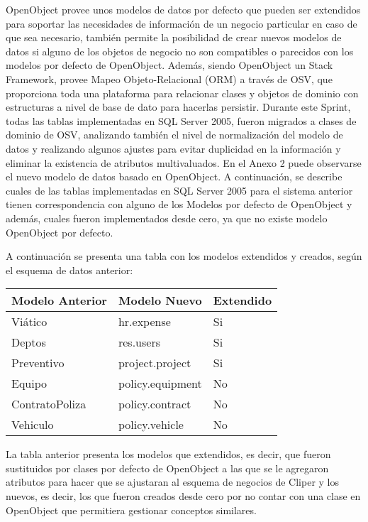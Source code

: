 \documentclass[a4paper, 12pt]{article}
\begin{document}
OpenObject provee unos modelos de datos por defecto que pueden ser extendidos para soportar las necesidades de información de un negocio particular en caso de que sea necesario, también permite la posibilidad de crear nuevos modelos de datos si alguno de los objetos de negocio no son compatibles o parecidos con los modelos por defecto de OpenObject. Además, siendo OpenObject un Stack Framework, provee Mapeo Objeto-Relacional (ORM) a través de OSV, que proporciona toda una plataforma para relacionar clases y objetos de dominio con estructuras a nivel de base de dato para hacerlas persistir. Durante este Sprint, todas las tablas implementadas en SQL Server 2005, fueron migrados a clases de dominio de OSV, analizando también el nivel de normalización del modelo de datos y realizando algunos ajustes para evitar duplicidad en la información y eliminar la existencia de atributos multivaluados. En el Anexo 2 puede observarse el nuevo modelo de datos basado en OpenObject. A continuación, se describe cuales de las tablas implementadas en SQL Server 2005 para el sistema anterior tienen correspondencia con alguno de los Modelos por defecto de OpenObject y además, cuales fueron implementados desde cero, ya que no existe modelo OpenObject por defecto.

A continuación se presenta una tabla con los modelos extendidos y creados, según el esquema de datos anterior:
\begin{center}
    \begin{tabular}{ | p{5cm} | p{5cm} | p{5cm} | }
        \hline
        \textbf{Modelo Anterior} & \textbf{Modelo Nuevo} & \textbf{Extendido} \\ \hline
        Viático & hr.expense & Si \\ \hline
        Deptos & res.users & Si \\ \hline
        Preventivo & project.project & Si \\ \hline
        Equipo & policy.equipment & No \\ \hline
        ContratoPoliza & policy.contract & No \\ \hline
        Vehiculo & policy.vehicle & No \\ \hline
    \end{tabular}
\end{center}

La tabla anterior presenta los modelos que extendidos, es decir, que fueron sustituidos por clases por defecto de OpenObject a las que se le agregaron atributos para hacer que se ajustaran al esquema de negocios de Cliper y los nuevos, es decir, los que fueron creados desde cero por no contar con una clase en OpenObject que permitiera gestionar conceptos similares.
\end{document}
